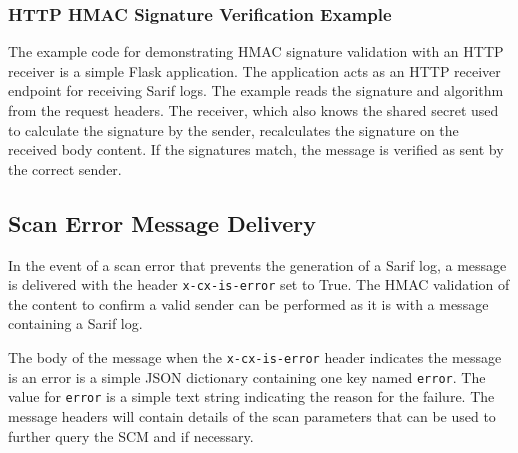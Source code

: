 \subsubsection{HTTP HMAC Signature Verification Example}

The example code for demonstrating HMAC signature validation with an HTTP receiver
is a simple Flask application. The application acts as an HTTP receiver endpoint
for receiving Sarif logs.  The example reads the signature and algorithm from the request
headers.  The receiver, which also knows the shared secret used to calculate the signature
by the sender, recalculates the signature on the received body content. If the signatures
match, the message is verified as sent by the correct sender.



\subsection{Scan Error Message Delivery}

In the event of a scan error that prevents the generation of a Sarif log, a message is delivered with the header
\texttt{x-cx-is-error} set to True.  The HMAC validation of the content to confirm a valid sender can be
performed as it is with a message containing a Sarif log.

The body of the message when the \texttt{x-cx-is-error} header indicates the message is an error is a simple
JSON dictionary containing one key named \texttt{error}.  The value for \texttt{error} is a simple text string
indicating the reason for the failure.  The message headers will contain details of the scan parameters that
can be used to further query the SCM and \cxone if necessary.

